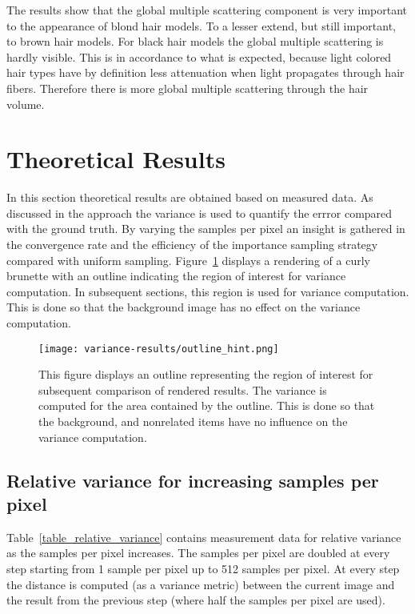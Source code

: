 \documentclass[11pt,a4paper]{report}
\begin{document}
The results show that the global multiple scattering component is very important to the appearance of blond hair models. To a lesser extend, but still important, to brown hair models. For black hair models the global multiple scattering is hardly visible. This is in accordance to what is expected, because light colored hair types have by definition less attenuation when light propagates through hair fibers. Therefore there is more global multiple scattering through the hair volume.

\section{Theoretical Results}

In this section theoretical results are obtained based on measured data. As discussed in the approach the variance is used to quantify the errror compared with the ground truth. By varying the samples per pixel an insight is gathered in the convergence rate and the efficiency of the importance sampling strategy compared with uniform sampling. Figure~\ref{fig_variance_outline} displays a rendering of a curly brunette with an outline indicating the region of interest for variance computation. In subsequent sections, this region is used for variance computation. This is done so that the background image has no effect on the variance computation.

\begin{figure}
\begin{center}
\texttt{[image: variance-results/outline\_hint.png]}
\end{center}
\caption{This figure displays an outline representing the region of interest for subsequent comparison of rendered results. The variance is computed for the area contained by the outline. This is done so that the background, and nonrelated items have no influence on the variance computation.}
\label{fig_variance_outline}
\end{figure}

\subsection{Relative variance for increasing samples per pixel}

Table~\ref{table_relative_variance} contains measurement data for relative variance as the samples per pixel increases. The samples per pixel are doubled at every step starting from 1 sample per pixel up to 512 samples per pixel. At every step the distance is computed (as a variance metric) between the current image and the result from the previous step (where half the samples per pixel are used).
\end{document}
